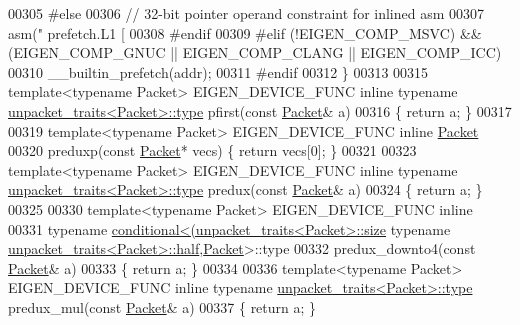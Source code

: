 \begin{DoxyCode}
{00305 \textcolor{preprocessor}{#else}
00306   \textcolor{comment}{// 32-bit pointer operand constraint for inlined asm}
00307   \textcolor{keyword}{asm}(\textcolor{stringliteral}{" prefetch.L1 [ %
00308 \textcolor{preprocessor}{#endif}
00309 \textcolor{preprocessor}{#elif (!EIGEN\_COMP\_MSVC) && (EIGEN\_COMP\_GNUC || EIGEN\_COMP\_CLANG || EIGEN\_COMP\_ICC)}
00310   \_\_builtin\_prefetch(addr);
00311 \textcolor{preprocessor}{#endif}
00312 \}
00313 
00315 \textcolor{keyword}{template}<\textcolor{keyword}{typename} Packet> EIGEN\_DEVICE\_FUNC \textcolor{keyword}{inline} \textcolor{keyword}{typename} 
      \hyperlink{union_eigen_1_1internal_1_1_packet}{unpacket\_traits<Packet>::type} pfirst(\textcolor{keyword}{const} \hyperlink{union_eigen_1_1internal_1_1_packet}{Packet}& a)
00316 \{ \textcolor{keywordflow}{return} a; \}
00317 
00319 \textcolor{keyword}{template}<\textcolor{keyword}{typename} Packet> EIGEN\_DEVICE\_FUNC \textcolor{keyword}{inline} \hyperlink{union_eigen_1_1internal_1_1_packet}{Packet}
00320 preduxp(\textcolor{keyword}{const} \hyperlink{union_eigen_1_1internal_1_1_packet}{Packet}* vecs) \{ \textcolor{keywordflow}{return} vecs[0]; \}
00321 
00323 \textcolor{keyword}{template}<\textcolor{keyword}{typename} Packet> EIGEN\_DEVICE\_FUNC \textcolor{keyword}{inline} \textcolor{keyword}{typename} 
      \hyperlink{union_eigen_1_1internal_1_1_packet}{unpacket\_traits<Packet>::type} predux(\textcolor{keyword}{const} \hyperlink{union_eigen_1_1internal_1_1_packet}{Packet}& a)
00324 \{ \textcolor{keywordflow}{return} a; \}
00325 
00330 \textcolor{keyword}{template}<\textcolor{keyword}{typename} Packet> EIGEN\_DEVICE\_FUNC \textcolor{keyword}{inline}
00331 \textcolor{keyword}{typename} \hyperlink{struct_eigen_1_1internal_1_1conditional}{conditional<(unpacket\_traits<Packet>::size}%
      typename} \hyperlink{union_eigen_1_1internal_1_1_packet}{unpacket\_traits<Packet>::half},\hyperlink{union_eigen_1_1internal_1_1_packet}{Packet}>::type
00332 predux\_downto4(\textcolor{keyword}{const} \hyperlink{union_eigen_1_1internal_1_1_packet}{Packet}& a)
00333 \{ \textcolor{keywordflow}{return} a; \}
00334 
00336 \textcolor{keyword}{template}<\textcolor{keyword}{typename} Packet> EIGEN\_DEVICE\_FUNC \textcolor{keyword}{inline} \textcolor{keyword}{typename} 
      \hyperlink{union_eigen_1_1internal_1_1_packet}{unpacket\_traits<Packet>::type} predux\_mul(\textcolor{keyword}{const} 
      \hyperlink{union_eigen_1_1internal_1_1_packet}{Packet}& a)
00337 \{ \textcolor{keywordflow}{return} a; \}
}
\end{DoxyCode}

